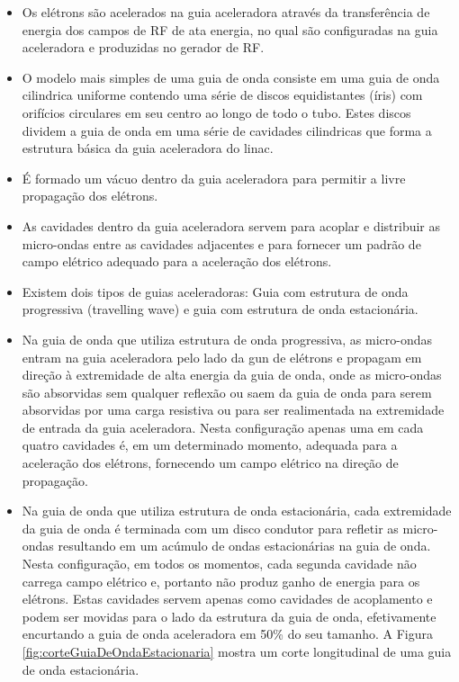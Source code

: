 \documentclass[11pt,a4paper]{article}
\begin{document}
                    \begin{itemize}
                        \item Os elétrons são acelerados na guia aceleradora através da transferência de energia dos campos de RF de ata energia, no qual são configuradas na guia aceleradora e produzidas no gerador de RF. 
                        
                        \item O modelo mais simples de uma guia de onda consiste em uma guia de onda cilindrica uniforme contendo uma  série de discos equidistantes (íris) com orifícios circulares em seu centro ao longo de todo o tubo. Estes discos dividem a guia de onda em uma série de cavidades cilindricas que forma a estrutura básica da guia aceleradora do linac. 
                        
                        \item É formado um vácuo dentro da guia aceleradora para permitir a livre propagação dos elétrons.
                        
                        \item As cavidades dentro da guia aceleradora servem para acoplar e distribuir as micro-ondas entre as cavidades adjacentes e para fornecer um padrão de campo elétrico adequado para a aceleração dos elétrons.
                        
                        \item Existem dois tipos de guias aceleradoras: Guia com estrutura de onda progressiva (travelling wave) e guia com estrutura de onda estacionária.
                        
                        \item Na guia de onda que utiliza estrutura de onda progressiva, as micro-ondas entram na guia aceleradora pelo lado da gun de elétrons e propagam em direção à extremidade de alta energia da guia de onda, onde as micro-ondas são absorvidas sem qualquer reflexão ou saem da guia de onda para serem absorvidas por uma carga resistiva ou para ser realimentada na extremidade de entrada da guia aceleradora. Nesta configuração apenas uma em cada quatro cavidades é, em um determinado momento, adequada para a aceleração dos elétrons, fornecendo um campo elétrico na direção de propagação.
                        
                        \item Na guia de onda que utiliza estrutura de onda estacionária, cada extremidade da guia de onda é terminada com um disco condutor para refletir as micro-ondas resultando em um acúmulo de ondas estacionárias na guia de onda. Nesta configuração, em todos os momentos, cada segunda cavidade não carrega campo elétrico e, portanto não produz ganho de energia para os elétrons. Estas cavidades servem apenas como cavidades de acoplamento e podem ser movidas para o lado da estrutura da guia de onda, efetivamente encurtando a guia de onda aceleradora em 50\% do seu tamanho. A Figura \ref{fig:corteGuiaDeOndaEstacionaria} mostra um corte longitudinal de uma guia de onda estacionária.
                    \end{itemize}
\end{document}
